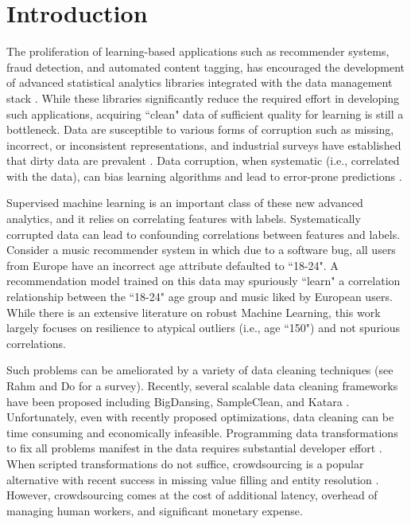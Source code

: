 \section{Introduction}
The proliferation of learning-based applications such as recommender systems, fraud detection, and automated content tagging, has encouraged the development of advanced statistical analytics libraries integrated with the data management stack \cite{bdas, alexandrov2014stratosphere, crotty2014tupleware, hellerstein2012madlib}. 
While these libraries significantly reduce the required effort in developing such applications, acquiring ``clean" data of sufficient quality for learning is still a bottleneck.
Data are susceptible to various forms of corruption such as missing, incorrect, or inconsistent representations, and industrial surveys have established that dirty data are prevalent  \cite{Gartner}.
Data corruption, when systematic \cite{taylor1982introduction} (i.e., correlated with the data), can bias learning algorithms and lead to error-prone predictions \cite{xiaofeature}.

Supervised machine learning is an important class of these new advanced analytics, and it relies on correlating features with labels.
Systematically corrupted data can lead to confounding correlations between features and labels.
Consider a music recommender system in which due to a software bug, all users from Europe have an incorrect age attribute defaulted to ``18-24".
A recommendation model trained on this data may spuriously ``learn" a correlation relationship between the ``18-24" age group and music liked by European users.
While there is an extensive literature on robust Machine Learning, this work largely focuses on resilience to atypical outliers (i.e., age ``150") and not spurious correlations.

Such problems can be ameliorated by a variety of data cleaning techniques (see Rahm and Do \cite{rahm2000data} for a survey).
Recently, several scalable data cleaning frameworks have been proposed including BigDansing\cite{khayyat2015bigdansing}, SampleClean\cite{sampleclean}, and Katara \cite{chu2015katara}. 
Unfortunately, even with recently proposed optimizations, data cleaning can be time consuming and economically infeasible\cite{wang1999sample}.
Programming data transformations to fix all problems manifest in the data requires substantial developer effort \cite{kandel2012}.
When scripted transformations do not suffice, crowdsourcing is a popular alternative with recent success in missing value filling and entity resolution \cite{gokhale2014corleone, park2014crowdfill, sampleclean,chu2015katara}.
However, crowdsourcing comes at the cost of additional latency, overhead of managing human workers, and significant monetary expense.

